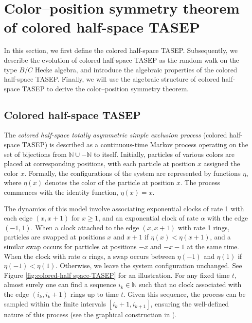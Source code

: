 \documentclass[12pt,a4paper]{amsart}
\theoremstyle{remark}
\numberwithin{equation}{section} \numberwithin{theorem}{section}
\begin{document}
\section{Color--position symmetry theorem of colored half-space TASEP}
\label{sec:ColorPositionSymmetry}

In this section, we first define the colored half-space TASEP. Subsequently, we describe the evolution of colored half-space TASEP as the random walk on the type $B/C$ Hecke algebra, and introduce the algebraic properties of the colored half-space TASEP. Finally, we will use the algebraic structure of colored half-space TASEP to derive the color--position symmetry theorem. 

\subsection{Colored half-space TASEP}
\label{ssec:Chs-TASEP}

The \emph{colored half-space totally asymmetric simple exclusion process} (colored half-space TASEP) is described as a continuous-time Markov process operating on the set of bijections from $\mathbb{N} \cup -\mathbb{N}$ to itself. Initially, particles of various colors are placed at corresponding positions, with each particle at position $x$ assigned the color $x$. Formally, the configurations of the system are represented by functions $\eta$, where $\eta(x)$ denotes the color of the particle at position $x$. The process commences with the identity function, $\eta(x) = x$.

The dynamics of this model involve associating exponential clocks of rate 1 with each edge $(x, x+1)$ for $x \geq 1$, and an exponential clock of rate $\alpha$ with the edge $(-1, 1)$. When a clock attached to the edge $(x,x+1)$ with rate 1 rings, particles are swapped at positions $x$ and $x+1$ if $\eta(x)<\eta(x+1)$, and a similar swap occurs for particles at positions $-x$ and $-x-1$ at the same time. When the clock with rate $\alpha$ rings, a swap occurs between $\eta(-1)$ and $\eta(1)$ if $\eta(-1)<\eta(1)$. Otherwise, we leave the system configuration unchanged. See Figure \ref{fig:colored-half space-TASEP} for an illustration. 
For any fixed time $t$, almost surely one can find a sequence $i_k\in\mathbb N$ such that no clock associated with the edge $(i_k,i_k+1)$ rings up to time $t$.
Given this sequence, the process can be sampled within the finite intervals $[i_k+1, i_{k+1}]$, ensuring the well-defined nature of this process (see the graphical construction in \cite{Har78}).
\end{document}
